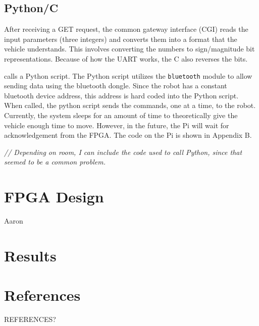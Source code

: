 \documentclass[12pt]{article}
\begin{document}
\subsection{Python/C}
After receiving a GET request, the common gateway interface (CGI) reads the input parameters (three integers) and converts them into a format that the vehicle understands. This involves converting the numbers to sign/magnitude bit representations. Because of how the UART works, the C also reverses the bits.

calls a Python script. The Python script utilizes the \verb.bluetooth. module to allow sending data using the bluetooth dongle. Since the robot has a constant bluetooth device address, this address is hard coded into the Python script. When called, the python script sends the commands, one at a time, to the robot. Currently, the system sleeps for an amount of time to theoretically give the vehicle enough time to move. However, in the future, the Pi will wait for acknowledgement from the FPGA. The code on the Pi is shown in Appendix B. 

{\it // Depending on room, I can include the code used to call Python, since that seemed to be a common problem.}

\section{FPGA Design}
Aaron
\section{Results}
\section{References}
\renewcommand{\refname}{}
\vspace{-1cm}
\begin{thebibliography}{widest entry}
REFERENCES?
\end{thebibliography}
\end{document}
